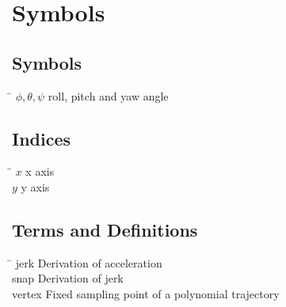 \chapter*{Symbols}\label{chap:symbole}

\section*{Symbols}
\begin{tabbing}
 \hspace*{3cm} \= \kill
  $\phi, \theta, \psi$ 		\> roll, pitch and yaw angle \\[0.5ex] 							
 \end{tabbing}

\section*{Indices}
\begin{tabbing}
 \hspace*{1.6cm}  \= \kill
 $x$ \> x axis \\[0.5ex]
 $y$ \> y axis \\[0.5ex]
 
\end{tabbing}

\section*{Terms and Definitions}
\begin{tabbing}
 \hspace*{1.6cm}  \= \kill
jerk \> Derivation of acceleration \\[0.5ex]
snap \> Derivation of jerk \\[0.5ex]
vertex \> Fixed sampling point of a polynomial trajectory \\[0.5ex]
\end{tabbing}

